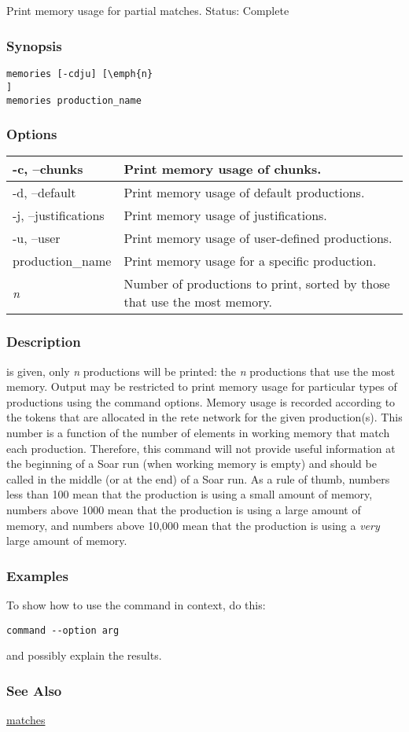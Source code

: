 \subsection{}
\label{memories}
Print memory usage for partial matches. 
 Status: Complete
\subsubsection*{Synopsis}
\begin{verbatim}
memories [-cdju] [\emph{n}
]
memories production_name 
\end{verbatim}
\subsubsection*{Options}
\begin{tabular}{|l|l|}
\hline 
 -c, --chunks  & Print memory usage of chunks.  \\
 \hline 
 -d, --default  & Print memory usage of default productions.  \\
 \hline 
 -j, --justifications  & Print memory usage of justifications.  \\
 \hline 
 -u, --user  & Print memory usage of user-defined productions.  \\
 \hline 
production\_name & Print memory usage for a specific production.  \\
 \hline 
\emph{n}
 & Number of productions to print, sorted by those that use the most memory.  \\
 \hline 
\end{tabular}
\subsubsection*{Description}
 is given, only \emph{n}
 productions will be printed: the \emph{n}
 productions that use the most memory. Output may be restricted to print memory usage for particular types of productions using the command options. 
 Memory usage is recorded according to the tokens that are allocated in the rete network for the given production(s). This number is a function of the number of elements in working memory that match each production. Therefore, this command will not provide useful information at the beginning of a Soar run (when working memory is empty) and should be called in the middle (or at the end) of a Soar run. 
 As a rule of thumb, numbers less than 100 mean that the production is using a small amount of memory, numbers above 1000 mean that the production is using a large amount of memory, and numbers above 10,000 mean that the production is using a \emph{very}
 large amount of memory. 
\subsubsection*{Examples}
 To show how to use the command in context, do this: \begin{verbatim}
command --option arg
\end{verbatim}
 and possibly explain the results. 
\subsubsection*{See Also}
\hyperref[matches]{matches} 